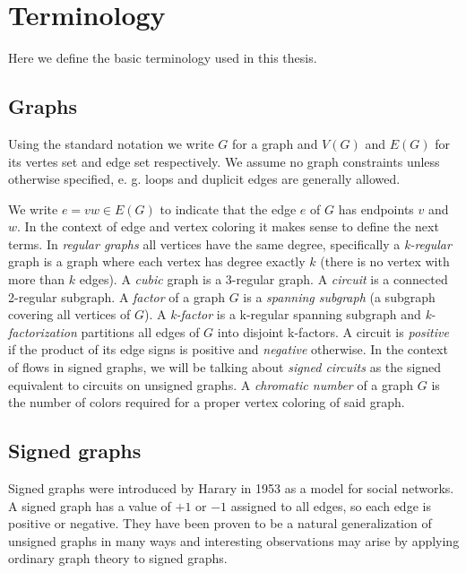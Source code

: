 \chapter{Terminology}\label{ch:terminology}

Here we define the basic terminology used in this thesis.

\section{Graphs}

Using the standard notation we write $G$ for a graph and $V(G)$ and $E(G)$ for its vertes set and edge set respectively.
We assume no graph constraints unless otherwise specified, e. g. loops and duplicit edges are generally allowed.

We write $e = vw \in E(G)$ to indicate that the edge $e$ of $G$ has endpoints $v$ and $w$.
In the context of edge and vertex coloring it makes sense to define the next terms. In \textit{regular graphs} all vertices have the same degree, specifically
a \textit{k-regular} graph is a graph where each vertex has degree exactly $k$ (there is no vertex with more than $k$ edges).
A \textit{cubic} graph is a 3-regular graph. 
A \textit{circuit} is a connected 2-regular subgraph. A \textit{factor} of a graph $G$ is a \textit{spanning subgraph} (a subgraph covering all vertices of $G$).
A \textit{k-factor} is a k-regular spanning subgraph and \textit{k-factorization} partitions all edges of $G$ into disjoint k-factors.
A circuit is \textit{positive} if the product of its edge signs is positive and 
\textit{negative} otherwise. In the context of flows in signed graphs, we will be talking about \textit{signed circuits}
as the signed equivalent to circuits on unsigned graphs.
A \textit{chromatic number} of a graph $G$ is the number of colors required for a proper vertex coloring of said graph.

\section{Signed graphs}

Signed graphs were introduced by Harary\cite{harary} in 1953 as a model for social networks. 
A signed graph has a value of $+1$ or $-1$ assigned to all edges, so each edge is positive or negative.
They have been proven to be a natural generalization of unsigned graphs in many ways and interesting observations may arise
by applying ordinary graph theory to signed graphs.


